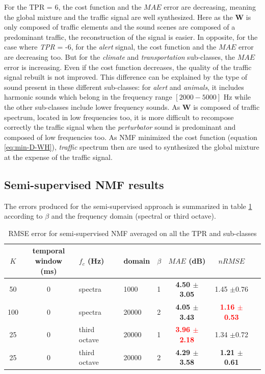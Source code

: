 \documentclass[twocolumn,a4paper,10pt]{article}
\begin{document}
For the TPR = 6, the cost function and the $MAE$ error are decreasing, meaning the global mixture and the traffic signal are well synthesized. Here as the $\mathbf{W}$ is only composed of traffic elements and the sound scenes are composed of a predominant traffic, the reconstruction of the signal is easier. In opposite, for the case where \textit{TPR} = -6, for the \textit{alert} signal, the cost function and the $MAE$ error are decreasing too. But for the \textit{climate} and \textit{transportation} sub-classes, the $MAE$ error is increasing. Even if the cost function decreases, the quality of the traffic signal rebuilt is not improved. This difference can be explained by the type of sound present in these different sub-classes: for \textit{alert} and \textit{animals}, it includes harmonic sounds which belong in the frequency range $\left[2000-5000\right]$ Hz while the other sub-classes include lower frequency sounds.  As $\mathbf{W}$ is composed of traffic spectrum, located in low frequencies too, it is more difficult to recompose correctly the traffic signal when the \textit{perturbator} sound is predominant and composed of low frequencies too. As NMF minimized the cost function (equation \ref{eq:min-D-WH}), \textit{traffic} spectrum then are used to synthesized the global mixture at the expense of the traffic signal.

\subsection{Semi-supervised NMF results}

The errors produced for the semi-supervised approach is summarized in table \ref{tab:results_semi_supervised} according to $\beta$ and the frequency domain (spectral or third octave).\\

\begin{table}
\centering
\begin{tabular}{cclllccc}
$K$ & \shortstack{temporal\\window (ms)} & $f_c$ (Hz) & domain & $\beta$ & $MAE$ (dB) & $nRMSE$ \\
\hline
 50 & 0 & spectra &  1000 & 1 & \textbf{4.50 $\pm$3.05} & 1.45 $\pm$0.76 \\
100 & 0 & spectra & 20000 & 2 & \textbf{4.05 $\pm$3.43} & \textbf{\textcolor{red}{1.16 $\pm$0.53}} \\
 25 & 0 & third octave & 20000 & 1 & \textbf{\textcolor{red}{3.96 $\pm$2.18}} & 1.34 $\pm$0.72 \\
 25 & 0 & third octave & 20000 & 2 & \textbf{4.29 $\pm$3.58} & \textbf{1.21 $\pm$0.61}
\end{tabular}
\caption{RMSE error for semi-supervised NMF averaged on all the TPR and sub-classes}
\label{tab:results_semi_supervised}
\end{table}
\end{document}
